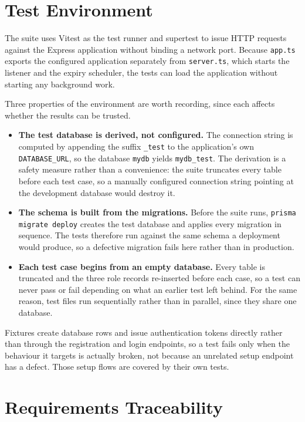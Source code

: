\section{Test Environment}

The suite uses Vitest \cite{vitest_docs} as the test runner and supertest \cite{supertest_repo} to issue HTTP requests against the Express application without binding a network port. Because \texttt{app.ts} exports the configured application separately from \texttt{server.ts}, which starts the listener and the expiry scheduler, the tests can load the application without starting any background work.

Three properties of the environment are worth recording, since each affects whether the results can be trusted.

\begin{itemize}
	\item \textbf{The test database is derived, not configured.} The connection string is computed by appending the suffix \texttt{\_test} to the application's own \texttt{DATABASE\_URL}, so the database \texttt{mydb} yields \texttt{mydb\_test}. The derivation is a safety measure rather than a convenience: the suite truncates every table before each test case, so a manually configured connection string pointing at the development database would destroy it.
	\item \textbf{The schema is built from the migrations.} Before the suite runs, \texttt{prisma migrate deploy} creates the test database and applies every migration in sequence. The tests therefore run against the same schema a deployment would produce, so a defective migration fails here rather than in production.
	\item \textbf{Each test case begins from an empty database.} Every table is truncated and the three role records re-inserted before each case, so a test can never pass or fail depending on what an earlier test left behind. For the same reason, test files run sequentially rather than in parallel, since they share one database.
\end{itemize}

Fixtures create database rows and issue authentication tokens directly rather than through the registration and login endpoints, so a test fails only when the behaviour it targets is actually broken, not because an unrelated setup endpoint has a defect. Those setup flows are covered by their own tests.

\section{Requirements Traceability}

